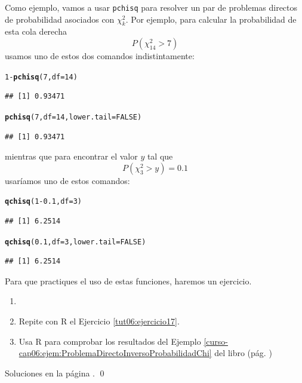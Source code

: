 \documentclass[10pt,a4paper]{article}\usepackage[]{graphicx}\usepackage[]{color}
\makeatletter
\newcommand{\hlnum}[1]{\textcolor[rgb]{0.686,0.059,0.569}{#1}}%
\newcommand{\hlopt}[1]{\textcolor[rgb]{0,0,0}{#1}}%
\newcommand{\hlstd}[1]{\textcolor[rgb]{0.345,0.345,0.345}{#1}}%
\newcommand{\hlkwc}[1]{\textcolor[rgb]{0.333,0.667,0.333}{#1}}%
\newcommand{\hlkwd}[1]{\textcolor[rgb]{0.737,0.353,0.396}{\textbf{#1}}}%
\newenvironment{kframe}{%
 \def\at@end@of@kframe{}%
 \ifinner\ifhmode%
  \def\at@end@of@kframe{\end{minipage}}%
  \begin{minipage}{\columnwidth}%
 \fi\fi%
 \def\FrameCommand##1{\hskip\@totalleftmargin \hskip-\fboxsep
 \colorbox{shadecolor}{##1}\hskip-\fboxsep
     \hskip-\linewidth \hskip-\@totalleftmargin \hskip\columnwidth}%
 \MakeFramed {\advance\hsize-\width
   \@totalleftmargin\z@ \linewidth\hsize
   \@setminipage}}%
 {\par\unskip\endMakeFramed%
 \at@end@of@kframe}
\newenvironment{knitrout}{}{} %
\newcounter {cont01}
\makeatother
\begin{document}
Como ejemplo, vamos a usar {\tt pchisq} para resolver un par de problemas directos de probabilidad asociados con $\chi^2_k$. Por ejemplo, para calcular la probabilidad de esta cola derecha
\[P(\chi^2_{14} > 7)\]
usamos uno de estos dos comandos indistintamente:
\begin{knitrout}
\color{fgcolor}\begin{kframe}
\begin{alltt}
\hlnum{1} \hlopt{-} \hlkwd{pchisq}\hlstd{(}\hlnum{7}\hlstd{,} \hlkwc{df}\hlstd{=}\hlnum{14}\hlstd{)}
\end{alltt}
\begin{verbatim}
## [1] 0.93471
\end{verbatim}
\begin{alltt}
\hlkwd{pchisq}\hlstd{(}\hlnum{7}\hlstd{,} \hlkwc{df}\hlstd{=}\hlnum{14}\hlstd{,} \hlkwc{lower.tail}\hlstd{=}\hlnum{FALSE}\hlstd{)}
\end{alltt}
\begin{verbatim}
## [1] 0.93471
\end{verbatim}
\end{kframe}
\end{knitrout}
mientras que para encontrar el valor $y$ tal que
\[P( \chi^2_3 > y ) = 0.1\]
usaríamos uno de estos comandos:
\begin{knitrout}
\color{fgcolor}\begin{kframe}
\begin{alltt}
\hlkwd{qchisq}\hlstd{(}\hlnum{1} \hlopt{-}\hlnum{0.1}\hlstd{,} \hlkwc{df}\hlstd{=}\hlnum{3}\hlstd{)}
\end{alltt}
\begin{verbatim}
## [1] 6.2514
\end{verbatim}
\begin{alltt}
\hlkwd{qchisq}\hlstd{(}\hlnum{0.1}\hlstd{,} \hlkwc{df}\hlstd{=}\hlnum{3}\hlstd{,} \hlkwc{lower.tail}\hlstd{=}\hlnum{FALSE}\hlstd{)}
\end{alltt}
\begin{verbatim}
## [1] 6.2514
\end{verbatim}
\end{kframe}
\end{knitrout}
Para que practiques el uso de estas funciones, haremos un ejercicio.
\begin{ejercicio}
\label{tut06:ejercicio19}
\begin{enumerate}
  \item[]
  \item Repite con R el Ejercicio \ref{tut06:ejercicio17}.
  \item Usa R para comprobar los resultados del Ejemplo \ref{curso-cap06:ejem:ProblemaDirectoInversoProbabilidadChi} del libro (pág. \pageref{curso-cap06:ejem:ProblemaDirectoInversoProbabilidadChi})
\end{enumerate}

Soluciones en la página \pageref{tut06:ejercicio19:sol}.
\qed
\end{ejercicio}
\end{document}
